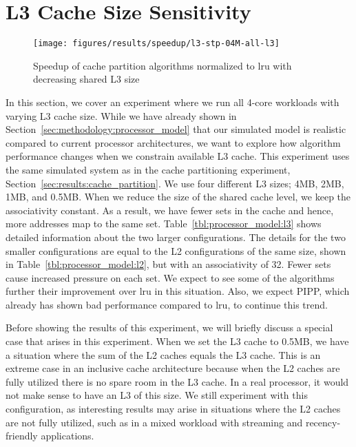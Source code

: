 \section{L3 Cache Size Sensitivity}
\label{sec:results:l3size_sensitivity}


\begin{figure}[th]
    \centering
    \texttt{[image: figures/results/speedup/l3-stp-04M-all-l3]}
    \caption[Speedup with decreasing L3 size]{Speedup of cache partition algorithms normalized to \gls{lru} with decreasing shared L3 size}
    \label{fig:results:l3}
\end{figure}

In this section, we cover an experiment where we run all 4-core workloads with varying L3 cache size.
While we have already shown in Section~\ref{sec:methodology:processor_model} that our simulated model is realistic compared to current processor architectures, we want to explore how algorithm performance changes when we constrain available L3 cache.
This experiment uses the same simulated system as in the cache partitioning experiment, Section~\ref{sec:results:cache_partition}.
We use four different L3 sizes; 4MB, 2MB, 1MB, and 0.5MB.
When we reduce the size of the shared cache level, we keep the associativity constant.
As a result, we have fewer sets in the cache and hence, more addresses map to the same set.
Table~\ref{tbl:processor_model:l3} shows detailed information about the two larger configurations.
The details for the two smaller configurations are equal to the L2 configurations of the same size, shown in Table~\ref{tbl:processor_model:l2}, but with an associativity of 32.
Fewer sets cause increased pressure on each set.
We expect to see some of the algorithms further their improvement over \gls{lru} in this situation.
Also, we expect PIPP, which already has shown bad performance compared to \gls{lru}, to continue this trend.

Before showing the results of this experiment, we will briefly discuss a special case that arises in this experiment.
When we set the L3 cache to 0.5MB, we have a situation where the sum of the L2 caches equals the L3 cache.
This is an extreme case in an inclusive cache architecture because when the L2 caches are fully utilized there is no spare room in the L3 cache.
In a real processor, it would not make sense to have an L3 of this size.
We still experiment with this configuration, as interesting results may arise in situations where the L2 caches are not fully utilized, such as in a mixed workload with streaming and recency-friendly applications.


